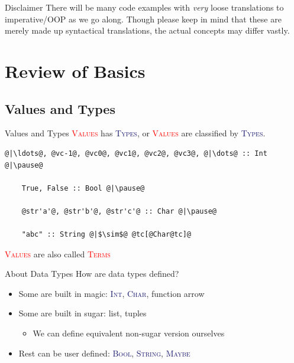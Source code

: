 \documentclass[xcolor={usenames,dvipsnames}]{beamer}
\newcommand{\htycon}[1]{\textcolor{MidnightBlue}{\textsc{#1}}}
\newcommand{\hvalcon}[1]{\textcolor{Red}{\textsc{#1}}}
\begin{document}
\begin{frame}{Disclaimer}
  There will be many code examples with \textit{very} loose translations to imperative/OOP as we go along. Though please keep in mind that these are merely made up syntactical translations, the actual concepts may differ vastly.
\end{frame}


\section{Review of Basics}

\subsection{Values and Types}

\begin{frame}[fragile]{Values and Types}
  \hvalcon{Values} has \htycon{Types}, or \hvalcon{Values} are classified by \htycon{Types}.\\

  \begin{lstlisting}[style=hask]
    @|\ldots@, @vc-1@, @vc0@, @vc1@, @vc2@, @vc3@, @|\dots@ :: Int @|\pause@

    True, False :: Bool @|\pause@

    @str'a'@, @str'b'@, @str'c'@ :: Char @|\pause@

    "abc" :: String @|$\sim$@ @tc[@Char@tc]@
  \end{lstlisting}

  \footnotesize{\hvalcon{Values} are also called \hvalcon{Terms}}
\end{frame}

\begin{frame}[fragile]{About Data Types}
  How are data types defined?\\
  \pause
  \begin{itemize}
    \item Some are built in magic: \htycon{Int}, \htycon{Char}, function arrow
    \pause
    \item Some are built in sugar: list, tuples
      \begin{itemize}
        \item We can define equivalent non-sugar version ourselves
      \end{itemize}
    \pause
    \item Rest can be user defined: \htycon{Bool}, \htycon{String}, \htycon{Maybe}
  \end{itemize}
\end{frame}
\end{document}
